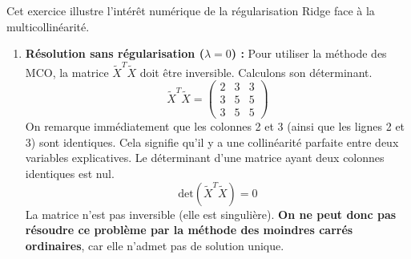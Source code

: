 \documentclass[solutions]{../exercices}
\begin{document}
\begin{solution}
	Cet exercice illustre l'intérêt numérique de la régularisation Ridge face à la multicollinéarité.

	\begin{enumerate}
		\item \textbf{Résolution sans régularisation ($\lambda = 0$) :}
		Pour utiliser la méthode des MCO, la matrice $\tilde{X}^T \tilde{X}$ doit être inversible. Calculons son déterminant.
		\[ \tilde{X}^T \tilde{X} = \begin{pmatrix} 2 & 3 & 3 \\ 3 & 5 & 5 \\ 3 & 5 & 5 \end{pmatrix} \]
		On remarque immédiatement que les colonnes 2 et 3 (ainsi que les lignes 2 et 3) sont identiques. Cela signifie qu'il y a une collinéarité parfaite entre deux variables explicatives.
		Le déterminant d'une matrice ayant deux colonnes identiques est nul.
		\[ \text{det}(\tilde{X}^T \tilde{X}) = 0 \]
		La matrice n'est pas inversible (elle est singulière). \textbf{On ne peut donc pas résoudre ce problème par la méthode des moindres carrés ordinaires}, car elle n'admet pas de solution unique.


\end{enumerate}
\end{solution}
\end{document}
